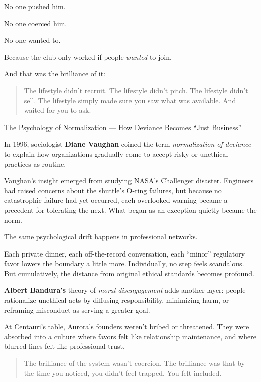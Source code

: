 No one pushed him. 

No one coerced him. 

No one wanted to. 

Because the club only worked if people \textit{wanted} to join.

And that was the brilliance of it:

\begin{quote}
The lifestyle didn’t recruit.  
The lifestyle didn’t pitch.  
The lifestyle didn’t sell.  
The lifestyle simply made sure you saw what was available.  
And waited for you to ask.
\end{quote}

\begin{PsychologicalSidebar}{The Psychology of Normalization --- How Deviance Becomes ``Just Business''}

  In 1996, sociologist \textbf{Diane Vaughan} coined the term \emph{normalization of deviance} to explain how 
  organizations gradually come to accept risky or unethical practices as routine.

  \medskip
  
  Vaughan’s insight emerged from studying NASA’s Challenger disaster. Engineers had raised concerns about the 
  shuttle’s O-ring failures, but because no catastrophic failure had yet occurred, each overlooked warning became 
  a precedent for tolerating the next. What began as an exception quietly became the norm.

  \medskip
  
  The same psychological drift happens in professional networks.

  \medskip
  
  Each private dinner, each off-the-record conversation, each “minor” regulatory favor lowers the boundary a little more. 
  Individually, no step feels scandalous. But cumulatively, the distance from original ethical standards becomes profound.

  \medskip
  
  \textbf{Albert Bandura’s} theory of \emph{moral disengagement} adds another layer: people rationalize unethical acts by 
  diffusing responsibility, minimizing harm, or reframing misconduct as serving a greater goal.

  \medskip
  
  At Centauri’s table, Aurora’s founders weren’t bribed or threatened. They were absorbed into 
  a culture where favors felt like relationship maintenance, and where blurred lines felt like professional trust.
  
  \begin{quote}
  The brilliance of the system wasn’t coercion.  The brilliance was that by the time you noticed, you didn’t feel trapped.  
  You felt included.
  \end{quote}
  
\end{PsychologicalSidebar}

